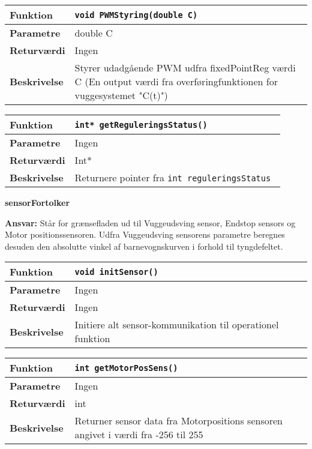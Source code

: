 \begin{center}
    \begin{tabular}{ | l | p{} |}
    \hline
    \textbf{Funktion}	& \verb+void PWMStyring(double C) +				\\ \hline
    \textbf{Parametre} 	& double C 		\\ \hline
    \textbf{Returværdi}	& Ingen														\\ \hline
    \textbf{Beskrivelse}	& Styrer udadgående PWM udfra fixedPointReg værdi C (En output værdi fra overføringfunktionen for vuggesystemet "C(t)")	\\ \hline
    \end{tabular}
\end{center}


\begin{center}
    \begin{tabular}{ | l | p{} |}
    \hline
    \textbf{Funktion}	& \verb+int* getReguleringsStatus() +				\\ \hline
    \textbf{Parametre} 	& Ingen 		\\ \hline
    \textbf{Returværdi}	& Int*														\\ \hline
    \textbf{Beskrivelse}	& Returnere pointer fra \verb+int reguleringsStatus + 	\\ \hline
    \end{tabular}
\end{center}

{\centering
\textbf{sensorFortolker}\par
}
\textbf{Ansvar:} Står for grænsefladen ud til Vuggeudsving sensor, Endstop sensors og Motor positionssensoren. Udfra Vuggeudsving sensorens parametre beregnes desuden den absolutte vinkel af barnevognskurven i forhold til tyngdefeltet. \

\begin{center}
    \begin{tabular}{ | l | p{} |}
    \hline
    \textbf{Funktion}	& \verb+void initSensor() +				\\ \hline
    \textbf{Parametre} 	& Ingen							 		\\ \hline
    \textbf{Returværdi}	& Ingen									\\ \hline
    \textbf{Beskrivelse}	& Initiere alt sensor-kommunikation til operationel funktion	\\ \hline
    \end{tabular}
\end{center}

\begin{center}
    \begin{tabular}{ | l | p{} |}
    \hline
    \textbf{Funktion}	& \verb+int getMotorPosSens() +				\\ \hline
    \textbf{Parametre} 	& Ingen							 		\\ \hline
    \textbf{Returværdi}	& int									\\ \hline
    \textbf{Beskrivelse}	& Returner sensor data fra Motorpositions sensoren angivet i værdi fra -256 til 255	\\ \hline
    \end{tabular}
\end{center}

